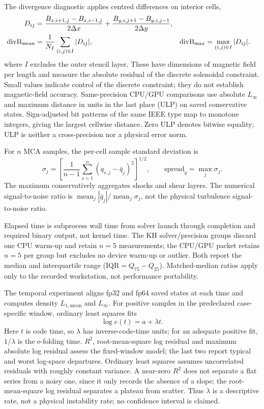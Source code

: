 The divergence diagnostic applies centred differences on interior cells,
\begin{align}
 D_{ij} &=\frac{B_{x,i+1,j}-B_{x,i-1,j}}{2\Delta x}
          +\frac{B_{y,i,j+1}-B_{y,i,j-1}}{2\Delta y}, \notag\\
 \mathrm{divB}_{\mathrm{mean}}
        &=\frac{1}{N_I}\sum_{(i,j)\in I}|D_{ij}|,
 &\mathrm{divB}_{\max}
        &=\max_{(i,j)\in I}|D_{ij}|.
 \label{eq:ch3-divb}
\end{align}
where $I$ excludes the outer stencil layer. These have dimensions of magnetic
field per length and measure the absolute residual of the discrete solenoidal
constraint. Small values indicate control of the discrete constraint; they do
not establish magnetic-field accuracy.
Same-precision CPU/GPU comparisons use absolute $L_\infty$ and maximum distance
in units in the last place (ULP) on saved conservative states. Sign-adjusted
bit patterns of the same
IEEE type map to monotone integers, giving the largest cellwise distance. Zero
ULP denotes bitwise equality; ULP is neither a cross-precision
nor a physical error norm.

For $n$ MCA samples, the per-cell sample standard deviation is
\begin{equation}
 \sigma_j=\left[\frac{1}{n-1}\sum_{s=1}^{n}
 (q_{s,j}-\bar q_j)^2\right]^{1/2},\qquad
 \mathrm{spread}_q=\max_j\sigma_j .
 \label{eq:ch3-mca-spread}
\end{equation}
The maximum conservatively aggregates shocks and shear layers. The numerical
signal-to-noise ratio is
$\operatorname{mean}_j|\bar q_j|/\operatorname{mean}_j\sigma_j$, not the physical
turbulence signal-to-noise ratio.

Elapsed time is subprocess wall time from solver launch through completion and
required binary output, not kernel time. The KH solver/precision groups discard
one CPU warm-up and retain $n=5$ measurements; the CPU/GPU packet retains
$n=5$ per group but excludes no device warm-up or outlier. Both report the
median and interquartile range ($\mathrm{IQR}=Q_{75}-Q_{25}$). Matched-median
ratios apply only to
the recorded workstation, not performance portability.

The temporal experiment aligns fp32 and fp64 saved states at each time and
computes density $L_{1,\mathrm{mean}}$ and $L_\infty$. For positive samples in
the predeclared case-specific window, ordinary least squares fits
\begin{equation}
 \log e(t)=a+\lambda t .
 \label{eq:ch3-temporal-fit}
\end{equation}
Here $t$ is code time, so $\lambda$ has inverse-code-time units; for an adequate
positive fit, $1/\lambda$ is the e-folding time. $R^2$, root-mean-square log
residual and maximum absolute log residual assess the fixed-window model; the
last two report typical and worst log-space departures.
Ordinary least squares assumes
uncorrelated residuals with roughly constant variance. A near-zero $R^2$ does
not separate a flat series from a noisy one, since it only records the absence
of a slope; the root-mean-square log residual separates a plateau from
scatter. Thus $\lambda$ is a
descriptive rate, not a physical instability
rate; no confidence interval is claimed.

